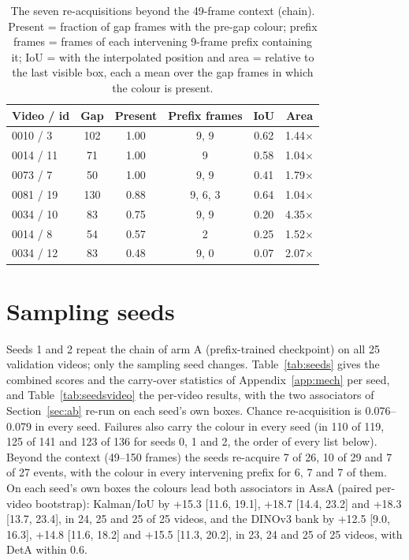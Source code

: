 \documentclass{article} %
\newcommand{\rev}[1]{{\color{blue}#1}}
\begin{document}
\begin{table}[h]
\caption{\rev{The seven re-acquisitions beyond the 49-frame context (chain). Present =
fraction of gap frames with the pre-gap colour; prefix frames = frames of each intervening
9-frame prefix containing it; IoU = with the interpolated position and area = relative to
the last visible box, each a mean over the gap frames in which the colour is present.}}
\label{tab:beyond}
\begin{center}
\scriptsize
\begin{tabular}{lccccc}
\toprule
\rev{Video / id} & \rev{Gap} & \rev{Present} & \rev{Prefix frames} & \rev{IoU} & \rev{Area} \\
\midrule
\rev{0010 / 3} & \rev{102} & \rev{1.00} & \rev{9, 9} & \rev{0.62} & \rev{1.44$\times$} \\
\rev{0014 / 11} & \rev{71} & \rev{1.00} & \rev{9} & \rev{0.58} & \rev{1.04$\times$} \\
\rev{0073 / 7} & \rev{50} & \rev{1.00} & \rev{9, 9} & \rev{0.41} & \rev{1.79$\times$} \\
\rev{0081 / 19} & \rev{130} & \rev{0.88} & \rev{9, 6, 3} & \rev{0.64} & \rev{1.04$\times$} \\
\rev{0034 / 10} & \rev{83} & \rev{0.75} & \rev{9, 9} & \rev{0.20} & \rev{4.35$\times$} \\
\rev{0014 / 8} & \rev{54} & \rev{0.57} & \rev{2} & \rev{0.25} & \rev{1.52$\times$} \\
\rev{0034 / 12} & \rev{83} & \rev{0.48} & \rev{9, 0} & \rev{0.07} & \rev{2.07$\times$} \\
\bottomrule
\end{tabular}
\end{center}
\end{table}

\rev{\section{Sampling seeds}
\label{app:seeds}
Seeds 1 and 2 repeat the chain of arm A (prefix-trained checkpoint) on all 25 validation
videos; only the sampling seed changes. Table~\ref{tab:seeds} gives the combined scores and
the carry-over statistics of Appendix~\ref{app:mech} per seed, and Table~\ref{tab:seedsvideo}
the per-video results, with the two associators of Section~\ref{sec:ab} re-run on each
seed's own boxes. Chance re-acquisition is 0.076--0.079 in every seed. Failures also carry
the colour in every seed (in 110 of 119, 125 of 141 and 123 of 136 for seeds 0, 1 and 2, the
order of every list below). Beyond the context
(49--150 frames) the seeds re-acquire 7 of 26, 10 of 29 and 7 of 27 events, with the colour in every intervening
prefix for 6, 7 and 7 of them. On each seed's own boxes the colours lead both associators in
AssA (paired per-video bootstrap): Kalman/IoU by +15.3 [11.6, 19.1], +18.7 [14.4, 23.2] and
+18.3 [13.7, 23.4], in 24, 25 and 25 of 25 videos, and the DINOv3 bank by +12.5 [9.0, 16.3],
+14.8 [11.6, 18.2] and +15.5 [11.3, 20.2], in 23, 24 and 25 of 25 videos, with DetA within 0.6.}
\end{document}
